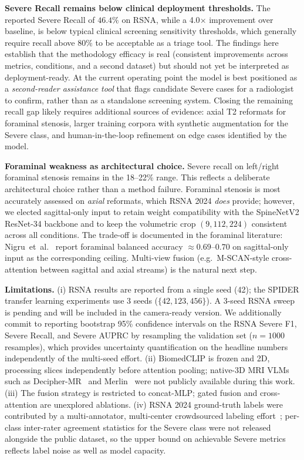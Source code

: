 \documentclass[conference]{IEEEtran}
\begin{document}
\textbf{Severe Recall remains below clinical deployment thresholds.}
The reported Severe Recall of $46.4\%$ on RSNA, while a 4.0$\times$
improvement over baseline, is below typical clinical screening
sensitivity thresholds, which generally require recall above $80\%$
to be acceptable as a triage tool. The findings here establish that
the methodology efficacy is real (consistent improvements across
metrics, conditions, and a second dataset) but should not yet be
interpreted as deployment-ready. At the current operating point the
model is best positioned as a \emph{second-reader assistance tool}
that flags candidate Severe cases for a radiologist to confirm,
rather than as a standalone screening system. Closing the remaining
recall gap likely requires additional sources of evidence: axial T2
reformats for foraminal stenosis, larger training corpora with
synthetic augmentation for the Severe class, and human-in-the-loop
refinement on edge cases identified by the model.

\textbf{Foraminal weakness as architectural choice.} Severe recall on
left/right foraminal stenosis remains in the 18--22\% range. This
reflects a deliberate architectural choice rather than a method
failure. Foraminal stenosis is most accurately assessed on
\emph{axial} reformats, which RSNA 2024 \emph{does} provide; however,
we elected sagittal-only input to retain weight compatibility with
the SpineNetV2 ResNet-34 backbone and to keep the volumetric crop
$(9, 112, 224)$ consistent across all conditions. The trade-off is
documented in the foraminal literature: Nigru~et~al.~\cite{nigru2024}
report foraminal balanced accuracy $\approx 0.69$--$0.70$ on
sagittal-only input as the corresponding ceiling. Multi-view fusion
(e.g.\ M-SCAN-style cross-attention between sagittal and axial
streams) is the natural next step.

\textbf{Limitations.} (i) RSNA results are reported from a single
seed (42); the SPIDER transfer learning experiments use 3 seeds
($\{42, 123, 456\}$). A 3-seed RSNA sweep is pending and will be
included in the camera-ready version. We additionally commit to
reporting bootstrap 95\% confidence intervals on the RSNA Severe F1,
Severe Recall, and Severe AUPRC by resampling the validation set
($n = 1000$ resamples), which provides uncertainty quantification on
the headline numbers independently of the multi-seed effort.
(ii) BiomedCLIP is
frozen and 2D, processing slices independently before
attention pooling; native-3D MRI VLMs such as
Decipher-MR~\cite{yang2026deciphermr} and Merlin~\cite{blankemeier2026merlin}
were not publicly available during this work. (iii) The fusion strategy
is restricted to concat-MLP; gated fusion and cross-attention are
unexplored ablations. (iv) RSNA 2024 ground-truth labels were
contributed by a multi-annotator, multi-center crowdsourced
labeling effort~\cite{kaggle2024}; per-class inter-rater agreement
statistics for the Severe class were not released alongside the
public dataset, so the upper bound on achievable Severe metrics
reflects label noise as well as model capacity.
\end{document}

